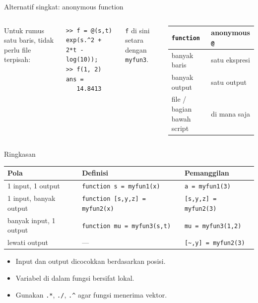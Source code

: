 \documentclass[aspectratio=169,11pt]{beamer}
\begin{document}
\begin{frame}[fragile]{Alternatif singkat: anonymous function}
\begin{columns}[T]
\small Untuk rumus satu baris, tidak perlu file terpisah:
\begin{lstlisting}[basicstyle=\ttfamily\footnotesize]
>> f = @(s,t) exp(s.^2 + 2*t - log(10));
>> f(1, 2)
ans =
   14.8413
\end{lstlisting}
\small \texttt{f} di sini setara dengan \texttt{myfun3}.
\small
\renewcommand{\arraystretch}{1.2}
\begin{tabular}{l l}
\toprule
\texttt{function} & anonymous \texttt{@} \\
\midrule
banyak baris & satu ekspresi \\
banyak output & satu output \\
file / bagian bawah script & di mana saja \\
\bottomrule
\end{tabular}
\end{columns}
\end{frame}

\begin{frame}{Ringkasan}
\centering\small
\renewcommand{\arraystretch}{1.3}
\begin{tabular}{l l l}
\toprule
Pola & Definisi & Pemanggilan \\
\midrule
1 input, 1 output & \texttt{function s = myfun1(x)} & \texttt{a = myfun1(3)} \\
1 input, banyak output & \texttt{function [s,y,z] = myfun2(x)} & \texttt{[s,y,z] = myfun2(3)} \\
banyak input, 1 output & \texttt{function mu = myfun3(s,t)} & \texttt{mu = myfun3(1,2)} \\
lewati output & --- & \texttt{[\textasciitilde,y] = myfun2(3)} \\
\bottomrule
\end{tabular}

\vspace{0.8em}
\raggedright
\begin{itemize}
  \item Input dan output dicocokkan berdasarkan \alert{posisi}.
  \item Variabel di dalam fungsi bersifat lokal.
  \item Gunakan \texttt{.*}, \texttt{./}, \texttt{.\textasciicircum} agar fungsi
        menerima vektor.
\end{itemize}
\end{frame}
\end{document}
